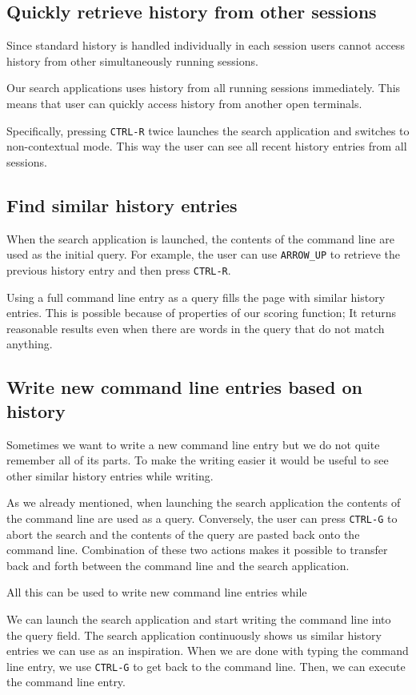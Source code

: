 \subsection{Quickly retrieve history from other sessions}

Since standard history is handled individually in each session users cannot access history from other simultaneously running sessions. 

Our search applications uses history from all running sessions immediately. This means that user can quickly access history from another open terminals. 

Specifically, pressing \verb|CTRL-R| twice launches the search application and switches to non-contextual mode. This way the user can see all recent history entries from all sessions.

\subsection{Find similar history entries}

When the search application is launched, the contents of the command line are used as the initial query. For example, the user can use \verb|ARROW_UP| to retrieve the previous history entry and then press \verb|CTRL-R|. 

Using a full command line entry as a query fills the page with similar history entries. This is possible because of properties of our scoring function; It returns reasonable results even when there are words in the query that do not match anything. 

\subsection{Write new command line entries based on history}

Sometimes we want to write a new command line entry but we do not quite remember all of its parts. To make the writing easier it would be useful to see other similar history entries while writing.

As we already mentioned, when launching the search application the contents of the command line are used as a query. Conversely, the user can press \verb|CTRL-G| to abort the search and the contents of the query are pasted back onto the command line.
Combination of these two actions makes it possible to transfer back and forth between the command line and the search application. 

All this can be used to write new command line entries while

We can launch the search application and start writing the command line into the query field. The search application continuously shows us similar history entries we can use as an inspiration. When we are done with typing the command line entry, we use \verb|CTRL-G| to get back to the command line. Then, we can execute the command line entry.



